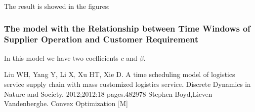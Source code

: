 \documentclass[12pt,a4paper]{article}
\begin{document}
The result is showed in the figures:\\

\subsubsection{The model with the Relationship between Time Windows of Supplier Operation and Customer Requirement}
In this model we have two coefficients $c$ and $\beta$.
\begin{thebibliography}{1}
  Liu WH, Yang Y, Li X, Xu HT, Xie D. A time scheduling model of logistics service supply chain with mass customized logistics service. Discrete Dynamics in Nature and Society. 2012;2012:18 pages.482978
 Stephen Boyd,Lieven Vandenberghe. Convex Optimization [M]
\end{thebibliography}
\end{document}

